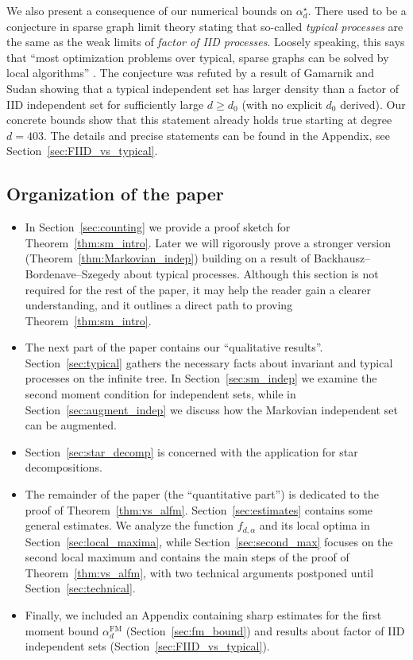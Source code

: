 \documentclass[12pt]{amsart}
\theoremstyle{definition}
\newcommand\al{\alpha}
\newcommand\alstar{\alpha^{\star}}
\newcommand\alfm{\alpha^{\mathrm{FM}}}
\begin{document}
We also present a consequence of our numerical bounds on $\alstar_d$. There used to be a conjecture in sparse graph limit theory stating that so-called \emph{typical processes} are the same as the weak limits of \emph{factor of IID processes}. Loosely speaking, this says that ``most optimization problems over typical, sparse graphs can be solved by local algorithms'' \cite{rahman2017local}. The conjecture was refuted by a result of Gamarnik and Sudan \cite{gamarnik2017limits} showing that a typical independent set has larger density than a factor of IID independent set for sufficiently large $d \geq d_0$ (with no explicit $d_0$ derived). Our concrete bounds show that this statement already holds true starting at degree $d=403$. The details and precise statements can be found in the Appendix, see Section~\ref{sec:FIID_vs_typical}.


\subsection*{Organization of the paper}
%
\begin{itemize}
\item In Section~\ref{sec:counting} we provide a proof sketch for Theorem~\ref{thm:sm_intro}. Later we will rigorously prove a stronger version (Theorem~\ref{thm:Markovian_indep}) building on a result of Backhausz--Bordenave--Szegedy \cite{backhausz2022typicality} about typical processes. Although this section is not required for the rest of the paper, it may help the reader gain a clearer understanding, and it outlines a direct path to proving Theorem~\ref{thm:sm_intro}.
\item The next part of the paper contains our ``qualitative results''. Section~\ref{sec:typical} gathers the necessary facts about invariant and typical processes on the infinite tree. In Section~\ref{sec:sm_indep} we examine the second moment condition for independent sets, while in Section~\ref{sec:augment_indep} we discuss how the Markovian independent set can be augmented. 
%
\item Section~\ref{sec:star_decomp} is concerned with the application for star decompositions. 
%
\item The remainder of the paper (the ``quantitative part'') is dedicated to the proof of Theorem~\ref{thm:vs_alfm}. Section~\ref{sec:estimates} contains some general estimates. We analyze the function $f_{d,\al}$ and its local optima in Section~\ref{sec:local_maxima}, while Section~\ref{sec:second_max} focuses on the second local maximum and contains the main steps of the proof of Theorem~\ref{thm:vs_alfm}, with two technical arguments postponed until Section~\ref{sec:technical}. 
%
\item Finally, we included an Appendix containing sharp estimates for the first moment bound $\alfm_d$ (Section~\ref{sec:fm_bound}) and results about factor of IID independent sets (Section~\ref{sec:FIID_vs_typical}). 
\end{itemize}
%
\end{document}
